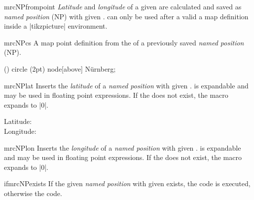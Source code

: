 \begin{docCommand}{mrcNPfrompoint}{}
  \emph{Latitude} and \emph{longitude} of a given  are
  calculated and saved as \emph{named position} (NP) with given .
   can only be used after a valid a map definition
  inside a |tikzpicture| environment.
  \begin{dispListing}
  \end{dispListing}
\end{docCommand}


\begin{docCommand}{mrcNPcs}{}
  A map point definition from the  of a previously saved
  \emph{named position} (NP).
  \begin{dispListing}
    \fill () circle (2pt) node[above] {N\"urnberg};
  \end{dispListing}
\end{docCommand}


\begin{docCommand}[doc updated=2024-08-02]{mrcNPlat}{}
  Inserts the \emph{latitude} of a \emph{named position} with given .
   is expandable and may be used in floating point expressions.
  If the  does not exist, the macro expands to |0|.
  \begin{dispExample}
    Latitude: \\
    Longitude: 
  \end{dispExample}
\end{docCommand}


\begin{docCommand}[doc updated=2024-08-02]{mrcNPlon}{}
  Inserts the \emph{longitude} of a \emph{named position} with given .
   is expandable and may be used in floating point expressions.
  If the  does not exist, the macro expands to |0|.
\end{docCommand}


\begin{docCommand}[doc new=2024-08-02]{ifmrcNPexists}{}
  If the given \emph{named position} with given  exists, the  code is executed, otherwise
  the  code.
\end{docCommand}


